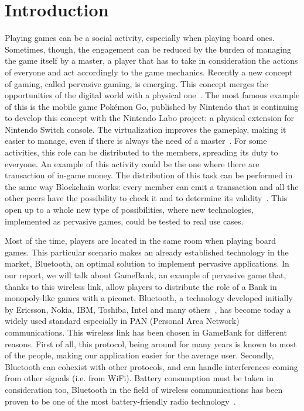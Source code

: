 \section{Introduction}
\label{introduction}

Playing games can be a social activity, especially when playing board ones. 
Sometimes, though, the engagement can be reduced by the burden of managing the 
game itself by a master, a player that has to take in consideration the actions 
of everyone and act accordingly to the game mechanics. Recently a new concept 
of gaming, called pervasive gaming, is emerging. This concept merges the 
opportunities of the digital world with a physical one~\cite{arango17}. The 
most famous example of this is the mobile game Pokémon Go, published by 
Nintendo that is continuing to develop this concept with the Nintendo Labo 
project: a physical extension for Nintendo Switch console.
The virtualization improves the gameplay, making it easier to manage, even if 
there is always the need of a master~\cite{bjork01}.
For some activities, this role can be distributed to the members, spreading its 
duty to everyone. An example of this activity could be the one where there are 
transaction of in-game money. The distribution of this task can be performed in 
the same way Blockchain works: every member can emit a transaction and all the 
other peers have the possibility to check it and to determine its 
validity~\cite{nakamoto08}. This open up to a whole new type of possibilities, 
where new technologies, implemented as pervasive games, could be tested to real 
use cases.

Most of the time, players are located in the same room when playing board 
games. This particular scenario makes an already established technology in 
the market, Bluetooth, an optimal solution to implement pervasive applications. 
In our report, we will talk about GameBank, an example of pervasive game that, 
thanks to this wireless link, allow players to distribute the role of a Bank in 
monopoly-like games with a piconet.
Bluetooth, a technology developed initially by Ericsson, Nokia, IBM, Toshiba, 
Intel and many others~\cite{haartsen00}, has become today a widely used
standard especially in PAN (Personal Area Network) communications. This
wireless link has been chosen in GameBank for different reasons. First of all,
this protocol, being around for many years is known to most of the people,
making our application easier for the average user. Secondly, Bluetooth can
cohexist with other protocols, and can handle interferences coming from other
signals (i.e. from WiFi). Battery consumption must be taken in consideration 
too, Bluetooth in the field of wireless communications has been proven to be 
one of the most battery-friendly radio technology~\cite{lee07}.

